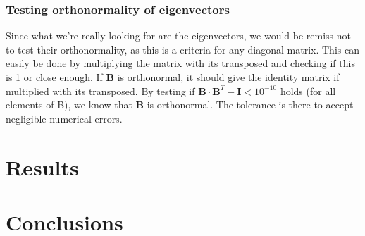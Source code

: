 \documentclass[10pt]{article}
\begin{document}
\begin{multicols}{2}
\subsubsection{Testing orthonormality of eigenvectors}
Since what we're really looking for are the eigenvectors, we would be
remiss not to test their orthonormality, as this is a criteria for any
diagonal matrix. This can easily be done by multiplying the matrix with its
transposed and checking if this is 1 or close enough. If $\textbf{B}$ is
orthonormal, it should give the identity matrix if multiplied with its
transposed. By testing if $\textbf{B}\cdot\textbf{B}^T -\textbf{I}<
10^{-10}$ holds (for all elements of B), we know that $\textbf{B}$ is
orthonormal. The tolerance is there to accept negligible numerical errors.



\section{Results}

\section{Conclusions}


{}


\end{multicols}
\end{document}
